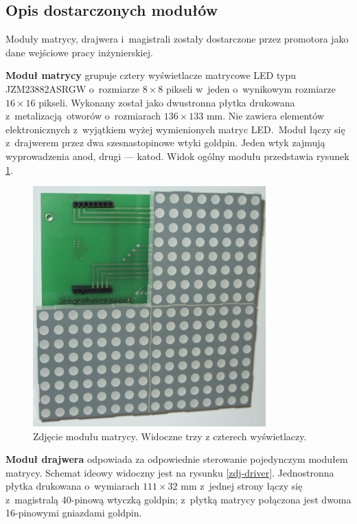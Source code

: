 \subsection{Opis dostarczonych modułów}

Moduły matrycy, drajwera i~magistrali zostały dostarczone przez promotora jako dane wejściowe pracy inżynierskiej.

\textbf{Moduł matrycy} grupuje cztery wyświetlacze matrycowe LED typu JZM23882ASR\-GW o~rozmiarze $ 8 \times 8 $ pikseli w~jeden o~wynikowym rozmiarze $16 \times 16$ pikseli. Wykonany został jako dwustronna płytka drukowana z~metalizacją otworów o~rozmiarach $136 \times 133$ mm. Nie zawiera elementów elektronicznych z~wyjątkiem wyżej wymienionych matryc LED.~Moduł łączy się z~drajwerem przez dwa szesnastopinowe wtyki goldpin. Jeden wtyk zajmują wyprowadzenia anod, drugi --- katod. Widok ogólny modułu przedstawia rysunek \ref{zdj-matryca}.

\begin{figure}[t]
    \begin{center}
       \includegraphics[width=0.8\textwidth]{figures/zdj-matryca.jpg}
    \end{center}

    \caption{Zdjęcie modułu matrycy. Widoczne trzy z czterech wyświetlaczy.}
    \label{zdj-matryca}
\end{figure}

\textbf{Moduł drajwera} odpowiada za odpowiednie sterowanie pojedynczym modułem matrycy. Schemat ideowy widoczny jest na rysunku \ref{zdj-driver}. Jednostronna płytka drukowana o~wymiarach $111 \times 32$ mm z~jednej strony łączy się z~magistralą 40-pinową wtyczką goldpin; z~płytką matrycy połączona jest dwoma 16-pinowymi gniazdami goldpin. 

